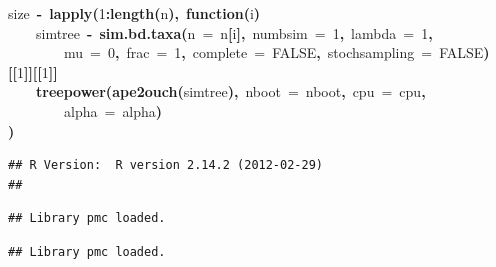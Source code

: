 \documentclass{elsarticle}
\makeatletter
\newcommand{\hlnumber}[1]{\textcolor[rgb]{0,0,0}{#1}}%
\newcommand{\hlfunctioncall}[1]{\textcolor[rgb]{.5,0,.33}{\textbf{#1}}}%
\newcommand{\hlkeyword}[1]{\textbf{#1}}%
\newcommand{\hlargument}[1]{\textcolor[rgb]{.69,.25,.02}{#1}}%
\newcommand{\hlformalargs}[1]{\hlargument{#1}}%
\newcommand{\hlassignement}[1]{\textbf{#1}}%
\newcommand{\hlsymbol}[1]{#1}%
\newcommand{\hlstd}[1]{\textcolor[rgb]{0,0,0}{#1}}%
\newenvironment{kframe}{%
 \def\FrameCommand##1{\hskip\@totalleftmargin \hskip-\fboxsep
 \colorbox{shadecolor}{##1}\hskip-\fboxsep
     \hskip-\linewidth \hskip-\@totalleftmargin \hskip\columnwidth}%
 \MakeFramed {\advance\hsize-\width
   \@totalleftmargin\z@ \linewidth\hsize
   \@setminipage}}%
 {\par\unskip\endMakeFramed}
\newenvironment{knitrout}{}{} %
\makeatother
\begin{document}
\begin{knitrout}
\begin{kframe}
\begin{flushleft}
\hlstd{}\hlsymbol{size}{\ }\hlassignement{\usebox{\hlnormalsizeboxlessthan}-}{\ }\hlfunctioncall{lapply}\hlkeyword{(}\hlnumber{1}\hlkeyword{:}\hlfunctioncall{length}\hlkeyword{(}\hlsymbol{n}\hlkeyword{)}\hlkeyword{,}{\ }\hlkeyword{function}\hlkeyword{(}\hlformalargs{i}\hlkeyword{)}{\ }\hlkeyword{\usebox{\hlnormalsizeboxopenbrace}}\hspace*{\fill}\\
\hlstd{}{\ }{\ }{\ }{\ }\hlsymbol{simtree}{\ }\hlassignement{\usebox{\hlnormalsizeboxlessthan}-}{\ }\hlfunctioncall{sim.bd.taxa}\hlkeyword{(}\hlargument{n}{\ }\hlargument{=}{\ }\hlsymbol{n}\hlkeyword{[}\hlsymbol{i}\hlkeyword{]}\hlkeyword{,}{\ }\hlargument{numbsim}{\ }\hlargument{=}{\ }\hlnumber{1}\hlkeyword{,}{\ }\hlargument{lambda}{\ }\hlargument{=}{\ }\hlnumber{1}\hlkeyword{,}\hspace*{\fill}\\
\hlstd{}{\ }{\ }{\ }{\ }{\ }{\ }{\ }{\ }\hlargument{mu}{\ }\hlargument{=}{\ }\hlnumber{0}\hlkeyword{,}{\ }\hlargument{frac}{\ }\hlargument{=}{\ }\hlnumber{1}\hlkeyword{,}{\ }\hlargument{complete}{\ }\hlargument{=}{\ }\hlnumber{FALSE}\hlkeyword{,}{\ }\hlargument{stochsampling}{\ }\hlargument{=}{\ }\hlnumber{FALSE}\hlkeyword{)}\hlkeyword{[[}\hlnumber{1}\hlkeyword{]}\hlkeyword{]}\hlkeyword{[[}\hlnumber{1}\hlkeyword{]}\hlkeyword{]}\hspace*{\fill}\\
\hlstd{}{\ }{\ }{\ }{\ }\hlfunctioncall{treepower}\hlkeyword{(}\hlfunctioncall{ape2ouch}\hlkeyword{(}\hlsymbol{simtree}\hlkeyword{)}\hlkeyword{,}{\ }\hlargument{nboot}{\ }\hlargument{=}{\ }\hlsymbol{nboot}\hlkeyword{,}{\ }\hlargument{cpu}{\ }\hlargument{=}{\ }\hlsymbol{cpu}\hlkeyword{,}\hspace*{\fill}\\
\hlstd{}{\ }{\ }{\ }{\ }{\ }{\ }{\ }{\ }\hlargument{alpha}{\ }\hlargument{=}{\ }\hlsymbol{alpha}\hlkeyword{)}\hspace*{\fill}\\
\hlstd{}\hlkeyword{\usebox{\hlnormalsizeboxclosebrace}}\hlkeyword{)}\mbox{}
\normalfont
\end{flushleft}
\begin{verbatim}
## R Version:  R version 2.14.2 (2012-02-29) 
## 
\end{verbatim}
\begin{verbatim}
## Library pmc loaded.
\end{verbatim}
\begin{verbatim}
## Library pmc loaded.
\end{verbatim}

\end{kframe}
\end{knitrout}
\end{document}
